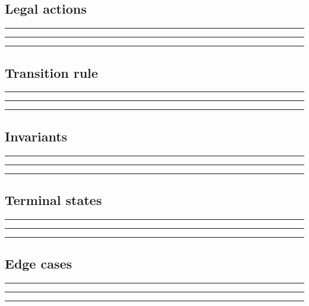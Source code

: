 \documentclass[11pt]{article}
\begin{document}
\subsection{Legal actions}
\noindent\rule{\linewidth}{0.3pt}\par\vspace{0.18in}
\noindent\rule{\linewidth}{0.3pt}\par\vspace{0.18in}
\noindent\rule{\linewidth}{0.3pt}\par\vspace{0.14in}

\subsection{Transition rule}
\noindent\rule{\linewidth}{0.3pt}\par\vspace{0.18in}
\noindent\rule{\linewidth}{0.3pt}\par\vspace{0.18in}
\noindent\rule{\linewidth}{0.3pt}\par\vspace{0.14in}

\subsection{Invariants}
\noindent\rule{\linewidth}{0.3pt}\par\vspace{0.18in}
\noindent\rule{\linewidth}{0.3pt}\par\vspace{0.18in}
\noindent\rule{\linewidth}{0.3pt}\par\vspace{0.14in}

\subsection{Terminal states}
\noindent\rule{\linewidth}{0.3pt}\par\vspace{0.18in}
\noindent\rule{\linewidth}{0.3pt}\par\vspace{0.18in}
\noindent\rule{\linewidth}{0.3pt}\par\vspace{0.14in}

\subsection{Edge cases}
\noindent\rule{\linewidth}{0.3pt}\par\vspace{0.18in}
\noindent\rule{\linewidth}{0.3pt}\par\vspace{0.18in}
\noindent\rule{\linewidth}{0.3pt}\par\vspace{0.14in}
\end{document}
